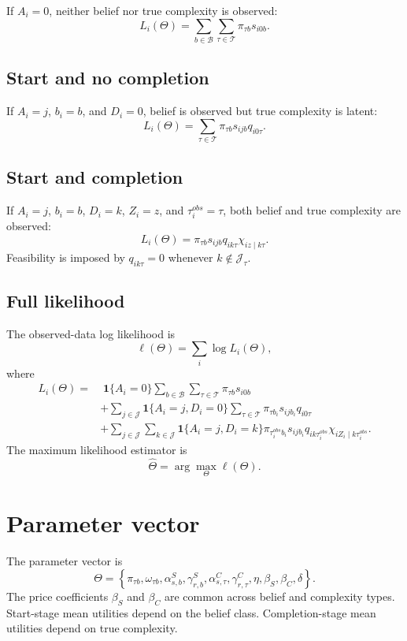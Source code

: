 \documentclass[11pt]{article}
\newcommand{\J}{\mathcal{J}}
\newcommand{\Tset}{\mathcal{T}}
\newcommand{\Bset}{\mathcal{B}}
\newcommand{\one}{\mathbf{1}}
\begin{document}
If $A_i=0$, neither belief nor true complexity is observed:
\[
L_i(\Theta)
=
\sum_{b\in\Bset}\sum_{\tau\in\Tset}
\pi_{\tau b}s_{i0b}.
\]

\subsection*{Start and no completion}

If $A_i=j$, $b_i=b$, and $D_i=0$, belief is observed but true complexity is latent:
\[
L_i(\Theta)
=
\sum_{\tau\in\Tset}
\pi_{\tau b}s_{ijb}q_{i0\tau}.
\]

\subsection*{Start and completion}

If $A_i=j$, $b_i=b$, $D_i=k$, $Z_i=z$, and $\tau_i^{obs}=\tau$, both belief and true complexity are observed:
\[
L_i(\Theta)
=
\pi_{\tau b}s_{ijb}q_{ik\tau}\chi_{iz\mid k\tau}.
\]
Feasibility is imposed by $q_{ik\tau}=0$ whenever $k\notin\J_\tau$.

\subsection*{Full likelihood}

The observed-data log likelihood is
\[
\ell(\Theta)=\sum_i\log L_i(\Theta),
\]
where
\[
\begin{aligned}
L_i(\Theta)
=&\;
\one\{A_i=0\}
\sum_{b\in\Bset}\sum_{\tau\in\Tset}
\pi_{\tau b}s_{i0b}
\\
&+
\sum_{j\in\J}
\one\{A_i=j,D_i=0\}
\sum_{\tau\in\Tset}
\pi_{\tau b_i}s_{ijb_i}q_{i0\tau}
\\
&+
\sum_{j\in\J}\sum_{k\in\J}
\one\{A_i=j,D_i=k\}
\pi_{\tau_i^{obs}b_i}s_{ijb_i}q_{ik\tau_i^{obs}}\chi_{iZ_i\mid k\tau_i^{obs}}.
\end{aligned}
\]
The maximum likelihood estimator is
\[
\widehat\Theta=\arg\max_\Theta \ell(\Theta).
\]

\section{Parameter vector}

The parameter vector is
\[
\Theta=
\left\{
\pi_{\tau b},
\omega_{\tau b},
\alpha^S_{s,b},
\gamma^S_{r,b},
\alpha^C_{s,\tau},
\gamma^C_{r,\tau},
\eta,
\beta_S,
\beta_C,
\delta
\right\}.
\]
The price coefficients $\beta_S$ and $\beta_C$ are common across belief and complexity types. Start-stage mean utilities depend on the belief class. Completion-stage mean utilities depend on true complexity.
\end{document}
